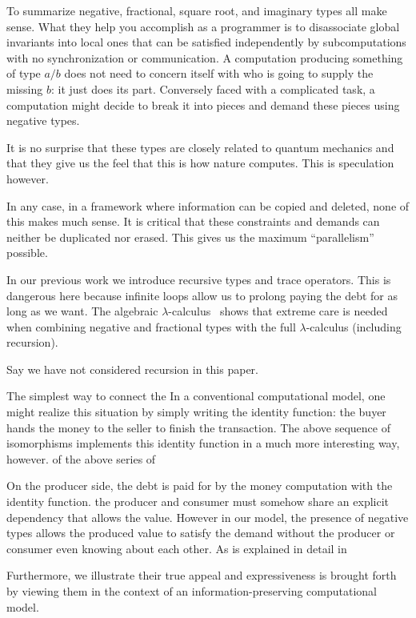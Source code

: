 \documentclass[preprint]{sigplanconf}
\begin{document}
To summarize negative, fractional, square root, and imaginary types all make
sense. What they help you accomplish as a programmer is to disassociate
global invariants into local ones that can be satisfied independently by
subcomputations with no synchronization or communication. A computation
producing something of type $a/b$ does not need to concern itself with who is
going to supply the missing $b$: it just does its part. Conversely faced with
a complicated task, a computation might decide to break it into pieces and
demand these pieces using negative types. 

It is no surprise that these types are closely related to quantum mechanics
and that they give us the feel that this is how nature computes. This is
speculation however.

In any case, in a framework where information can be copied and deleted, none
of this makes much sense. It is critical that these constraints and demands
can neither be duplicated nor erased.  This gives us the maximum
``parallelism'' possible.

In our previous work we introduce recursive types and trace operators. This
is dangerous here because infinite loops allow us to prolong paying the debt
for as long as we want. The algebraic
$\lambda$-calculus~\cite{Vaux:2009:ALC:1630585.1630590} shows that extreme
care is needed when combining negative and fractional types with the full
$\lambda$-calculus (including recursion).

Say we have not considered recursion in this paper.

The simplest way to connect the In a conventional computational model, one
might realize this situation by simply writing the identity function: the
buyer hands the money to the seller to finish the transaction. The above
sequence of isomorphisms implements this identity function in a much more
interesting way, however.  of the above series of

On the producer side, the debt is paid for by the money computation with the
identity function. the producer and consumer must somehow share an explicit
dependency that allows the value. However in our model, the presence of
negative types allows the produced value to satisfy the demand without the
producer or consumer even knowing about each other. As is explained in detail
in

Furthermore, we illustrate their true appeal and expressiveness is brought
forth by viewing them in the context of an information-preserving
computational model.
\end{document}
